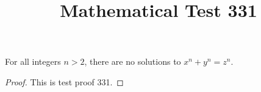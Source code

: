 \documentclass{amsart}
\begin{document}
\title{Mathematical Test 331}
\begin{theorem}
For all integers $n > 2$, there are no solutions to $x^n + y^n = z^n$.
\end{theorem}
\begin{proof}
This is test proof 331.
\end{proof}
\end{document}
